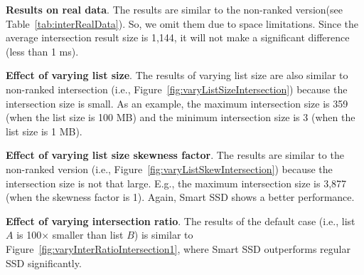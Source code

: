 \textbf{Results on real data}.
The results are similar to the non-ranked version(see Table~\ref{tab:interRealData}). So, we omit them due to space limitations. Since the average intersection result size is 1,144, it will not make a significant difference (less than 1 ms).




\textbf{Effect of varying list size}.
The results of varying list size are also similar to non-ranked intersection (i.e., Figure~\ref{fig:varyListSizeIntersection}) because the intersection size is small. As an example, the maximum intersection size is 359 (when the list size is 100 MB) and the minimum intersection size is 3 (when the list size is 1 MB).

\textbf{Effect of varying list size skewness factor}.
The results are similar to the non-ranked version (i.e., Figure~\ref{fig:varyListSkewIntersection}) because the intersection size is not that large. E.g., the maximum intersection size is 3,877 (when the skewness factor is 1). Again, Smart SSD shows a better performance.

\textbf{Effect of varying intersection ratio}.
The results of the default case (i.e., list $A$ is 100$\times$ smaller than list $B$) is similar to Figure~\ref{fig:varyInterRatioIntersection1}, where Smart SSD outperforms regular SSD significantly.

